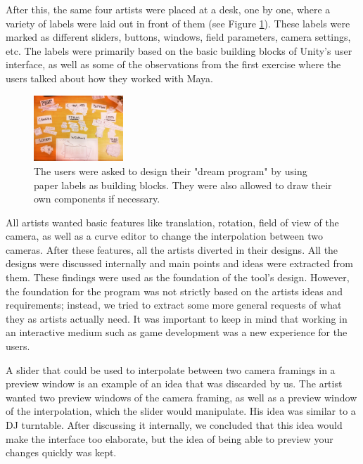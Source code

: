 After this, the same four artists were placed at a desk, one by one, where a variety of labels were laid out in front of them (see Figure \ref{fig:labels}). These labels were marked as different sliders, buttons, windows, field parameters, camera settings, etc. The labels were primarily based on the basic building blocks of Unity's user interface, as well as some of the observations from the first exercise where the users talked about how they worked with Maya.

\begin{figure}[htbp]
\centering
\includegraphics[width=0.3\textwidth]{Pics/labels}
\caption{The users were asked to design their "dream program" by using paper labels as building blocks. They were also allowed to draw their own components if necessary.}
\label{fig:labels}
\end{figure}

All artists wanted basic features like translation, rotation, field of view of the camera, as well as a curve editor to change the interpolation between two cameras. After these features, all the artists diverted in their designs. All the designs were discussed internally and main points and ideas were extracted from them. These findings were used as the foundation of the tool's design. However, the foundation for the program was not strictly based on the artists ideas and requirements; instead, we tried to extract some more general requests of what they as artists actually need. It was important to keep in mind that working in an interactive medium such as game development was a new experience for the users.

A slider that could be used to interpolate between two camera framings in a preview window is an example of an idea that was discarded by us. The artist wanted two preview windows of the camera framing, as well as a preview window of the interpolation, which the slider would manipulate. His idea was similar to a DJ turntable. After discussing it internally, we concluded that this idea would make the interface too elaborate, but the idea of being able to preview your changes quickly was kept.


